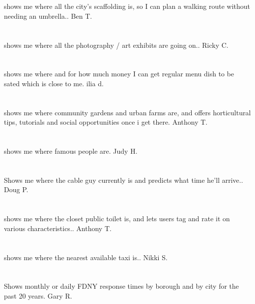 \section{}shows me where all the city's scaffolding is,  so I can plan a walking route without needing an umbrella.. Ben T.
\section{}shows me where all the photography / art exhibits are going on.. Ricky C.
\section{}shows me where and for how much money I can get regular menu dish to be sated which is close to me. ilia d.
\section{}shows me where community gardens and urban farms are,  and offers horticultural tips,  tutorials and social opportunities once i get there. Anthony T.
\section{}shows me where famous people are. Judy H.
\section{}Shows me where the cable guy currently is and predicts what time he'll arrive.. Doug P.
\section{}shows me where the closet public toilet is,  and lets users tag and rate it on various characteristics.. Anthony T.
\section{} shows me where the nearest available taxi is.. Nikki S.
\section{}Shows monthly or daily FDNY response times by borough and by city for the past 20 years. Gary R.
